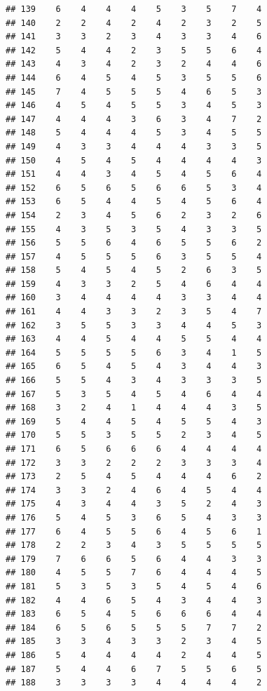 \documentclass[
]{article}
\begin{document}
\begin{verbatim}
## 139    6    4    4    4    5    3    5    7    4
## 140    2    2    4    2    4    2    3    2    5
## 141    3    3    2    3    4    3    3    4    6
## 142    5    4    4    2    3    5    5    6    4
## 143    4    3    4    2    3    2    4    4    6
## 144    6    4    5    4    5    3    5    5    6
## 145    7    4    5    5    5    4    6    5    3
## 146    4    5    4    5    5    3    4    5    3
## 147    4    4    4    3    6    3    4    7    2
## 148    5    4    4    4    5    3    4    5    5
## 149    4    3    3    4    4    4    3    3    5
## 150    4    5    4    5    4    4    4    4    3
## 151    4    4    3    4    5    4    5    6    4
## 152    6    5    6    5    6    6    5    3    4
## 153    6    5    4    4    5    4    5    6    4
## 154    2    3    4    5    6    2    3    2    6
## 155    4    3    5    3    5    4    3    3    5
## 156    5    5    6    4    6    5    5    6    2
## 157    4    5    5    5    6    3    5    5    4
## 158    5    4    5    4    5    2    6    3    5
## 159    4    3    3    2    5    4    6    4    4
## 160    3    4    4    4    4    3    3    4    4
## 161    4    4    3    3    2    3    5    4    7
## 162    3    5    5    3    3    4    4    5    3
## 163    4    4    5    4    4    5    5    4    4
## 164    5    5    5    5    6    3    4    1    5
## 165    6    5    4    5    4    3    4    4    3
## 166    5    5    4    3    4    3    3    3    5
## 167    5    3    5    4    5    4    6    4    4
## 168    3    2    4    1    4    4    4    3    5
## 169    5    4    4    5    4    5    5    4    3
## 170    5    5    3    5    5    2    3    4    5
## 171    6    5    6    6    6    4    4    4    4
## 172    3    3    2    2    2    3    3    3    4
## 173    2    5    4    5    4    4    4    6    2
## 174    3    3    2    4    6    4    5    4    4
## 175    4    3    4    4    3    5    2    4    3
## 176    5    4    5    3    6    5    4    3    3
## 177    6    4    5    5    6    4    5    6    1
## 178    2    2    3    4    3    5    5    5    5
## 179    7    6    6    5    6    4    4    3    3
## 180    4    5    5    7    6    4    4    4    5
## 181    5    3    5    3    5    4    5    4    6
## 182    4    4    6    5    4    3    4    4    3
## 183    6    5    4    5    6    6    6    4    4
## 184    6    5    6    5    5    5    7    7    2
## 185    3    3    4    3    3    2    3    4    5
## 186    5    4    4    4    4    2    4    4    5
## 187    5    4    4    6    7    5    5    6    5
## 188    3    3    3    3    4    4    4    4    2

\end{verbatim}
\end{document}

